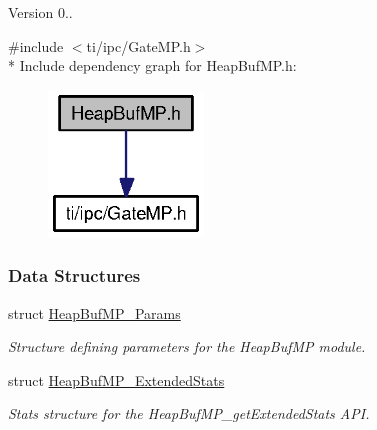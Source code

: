 \begin{DoxyVersion}{Version}
0.. 
\end{DoxyVersion}
{\ttfamily \#include $<$ti/ipc/\-Gate\-M\-P.\-h$>$}\\*
Include dependency graph for Heap\-Buf\-M\-P.\-h\-:
\nopagebreak
\begin{figure}[H]
\begin{center}
\leavevmode
\includegraphics[width=117pt]{_heap_buf_m_p_8h__incl}
\end{center}
\end{figure}
\subsubsection*{Data Structures}
\begin{DoxyCompactItemize}
\item 
struct \hyperlink{struct_heap_buf_m_p___params}{Heap\-Buf\-M\-P\-\_\-\-Params}
\begin{DoxyCompactList}\small\item\em Structure defining parameters for the Heap\-Buf\-M\-P module. \end{DoxyCompactList}\item 
struct \hyperlink{struct_heap_buf_m_p___extended_stats}{Heap\-Buf\-M\-P\-\_\-\-Extended\-Stats}
\begin{DoxyCompactList}\small\item\em Stats structure for the Heap\-Buf\-M\-P\-\_\-get\-Extended\-Stats A\-P\-I. \end{DoxyCompactList}\end{DoxyCompactItemize}
